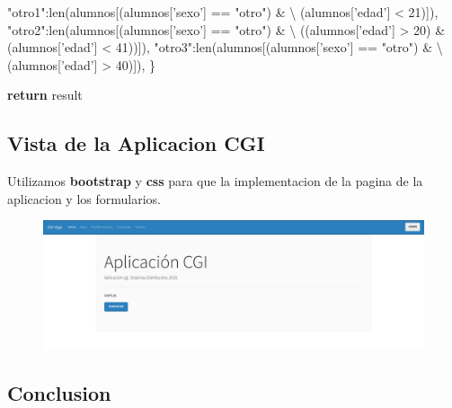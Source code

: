 \documentclass[12pt]{extarticle}
\newenvironment{Shaded}{}{}
\newcommand{\DecValTok}[1]{\textcolor[rgb]{0.25,0.63,0.44}{{#1}}}
\newcommand{\StringTok}[1]{\textcolor[rgb]{0.25,0.44,0.63}{{#1}}}
\newcommand{\NormalTok}[1]{{#1}}
\newcommand{\ControlFlowTok}[1]{\textcolor[rgb]{0.00,0.44,0.13}{\textbf{{#1}}}}
\newcommand{\OperatorTok}[1]{\textcolor[rgb]{0.40,0.40,0.40}{{#1}}}
\newcommand{\BuiltInTok}[1]{{#1}}
\begin{document}
\begin{Shaded}
\begin{Highlighting}[]
        \StringTok{"otro1"}\NormalTok{:}\BuiltInTok{len}\NormalTok{(alumnos[(alumnos[}\StringTok{'sexo'}\NormalTok{] }\OperatorTok{==} \StringTok{"otro"}\NormalTok{) }\OperatorTok{&} \OperatorTok{\textbackslash{}}
\NormalTok{                            (alumnos[}\StringTok{'edad'}\NormalTok{] }\OperatorTok{<} \DecValTok{21}\NormalTok{)]),}
        \StringTok{"otro2"}\NormalTok{:}\BuiltInTok{len}\NormalTok{(alumnos[(alumnos[}\StringTok{'sexo'}\NormalTok{] }\OperatorTok{==} \StringTok{"otro"}\NormalTok{) }\OperatorTok{&} \OperatorTok{\textbackslash{}}
\NormalTok{                            ((alumnos[}\StringTok{'edad'}\NormalTok{] }\OperatorTok{>} \DecValTok{20}\NormalTok{) }\OperatorTok{&}\NormalTok{ (alumnos[}\StringTok{'edad'}\NormalTok{] }\OperatorTok{<} \DecValTok{41}\NormalTok{))]),}
        \StringTok{"otro3"}\NormalTok{:}\BuiltInTok{len}\NormalTok{(alumnos[(alumnos[}\StringTok{'sexo'}\NormalTok{] }\OperatorTok{==} \StringTok{"otro"}\NormalTok{) }\OperatorTok{&} \OperatorTok{\textbackslash{}}
\NormalTok{                            (alumnos[}\StringTok{'edad'}\NormalTok{] }\OperatorTok{>} \DecValTok{40}\NormalTok{)]),}
\NormalTok{    \}}

    \ControlFlowTok{return}\NormalTok{ result}
\end{Highlighting}
\end{Shaded}

\subsection{Vista de la Aplicacion
CGI}\label{vista-de-la-aplicacion-cgi}

Utilizamos \textbf{bootstrap} y \textbf{css} para que la implementacion
de la pagina de la aplicacion y los formularios.

\begin{figure}[h]
\centering
\includegraphics{images/interfaz-cgi.png}
\caption{}
\end{figure}

\subsection{Conclusion}\label{conclusion}
\end{document}
